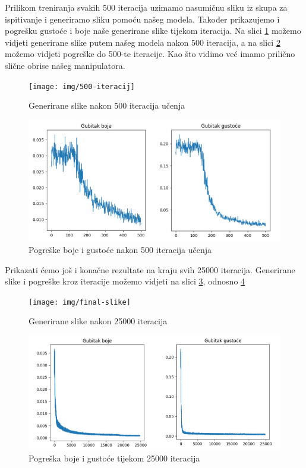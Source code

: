 \documentclass[times, utf8, diplomskirad]{fer}
\begin{document}
Prilikom treniranja svakih 500 iteracija uzimamo nasumičnu sliku iz skupa za ispitivanje i generiramo sliku pomoću našeg modela.
Također prikazujemo i pogrešku gustoće i boje naše generirane slike tijekom iteracija.
Na slici \ref{fig:500-iteracija} možemo vidjeti generirane slike putem našeg modela nakon 500 iteracija, a na slici \ref{fig:500-iteracija-graf} možemo vidjeti pogreške do 500-te iteracije.
Kao što vidimo već imamo prilično slične obrise našeg manipulatora.

\begin{figure}[H]
    \centering
    \texttt{[image: img/500-iteracij]}
    \caption{Generirane slike nakon 500 iteracija učenja}
    \label{fig:500-iteracija}
\end{figure}

\begin{figure}[H]
    \centering
    \includegraphics[width=15cm]{img/500-iteracija-graf}
    \caption{Pogreške boje i gustoće nakon 500 iteracija učenja}
    \label{fig:500-iteracija-graf}
\end{figure}

Prikazati ćemo još i konačne rezultate na kraju svih 25000 iteracija.
Generirane slike i pogreške kroz iteracije možemo vidjeti na slici \ref{fig:25000-iteracija-slika}, odnosno \ref{fig:25000-iteracija-graf}

\begin{figure}[H]
    \centering
    \texttt{[image: img/final-slike]}
    \caption{Generirane slike nakon 25000 iteracija}
    \label{fig:25000-iteracija-slika}
\end{figure}

\begin{figure}[H]
    \centering
    \includegraphics[width=15cm]{img/25000-iteracija-graf}
    \caption{Pogreška boje i gustoće tijekom 25000 iteracija}
    \label{fig:25000-iteracija-graf}
\end{figure}
\end{document}
